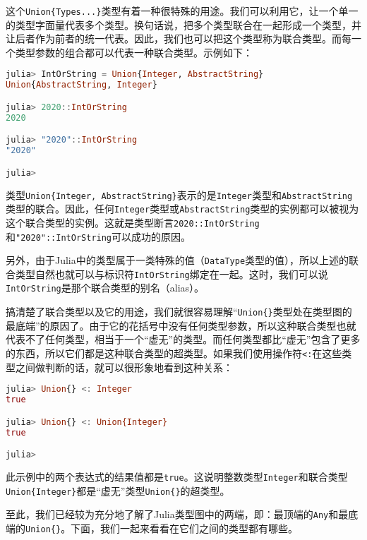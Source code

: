 这个\verb`Union{Types...}`类型有着一种很特殊的用途。我们可以利用它，让一个单一的类型字面量代表多个类型。换句话说，把多个类型联合在一起形成一个类型，并让后者作为前者的统一代表。因此，我们也可以把这个类型称为联合类型。而每一个类型参数的组合都可以代表一种联合类型。示例如下：

\begin{lstlisting}[language=julia]
julia> IntOrString = Union{Integer, AbstractString} 
Union{AbstractString, Integer}

julia> 2020::IntOrString
2020

julia> "2020"::IntOrString
"2020"

julia> 
\end{lstlisting}

类型\verb`Union{Integer, AbstractString}`表示的是\verb`Integer`类型和\verb`AbstractString`类型的联合。因此，任何\verb`Integer`类型或\verb`AbstractString`类型的实例都可以被视为这个联合类型的实例。这就是类型断言\verb`2020::IntOrString`和\verb`"2020"::IntOrString`可以成功的原因。

另外，由于Julia中的类型属于一类特殊的值（\verb`DataType`类型的值），所以上述的联合类型自然也就可以与标识符\verb`IntOrString`绑定在一起。这时，我们可以说\verb`IntOrString`是那个联合类型的别名（alias）。

搞清楚了联合类型以及它的用途，我们就很容易理解“\verb`Union{}`类型处在类型图的最底端”的原因了。由于它的花括号中没有任何类型参数，所以这种联合类型也就代表不了任何类型，相当于一个“虚无”的类型。而任何类型都比“虚无”包含了更多的东西，所以它们都是这种联合类型的超类型。如果我们使用操作符\verb`<:`在这些类型之间做判断的话，就可以很形象地看到这种关系：

\begin{lstlisting}[language=julia]
julia> Union{} <: Integer
true

julia> Union{} <: Union{Integer}
true

julia> 
\end{lstlisting}

此示例中的两个表达式的结果值都是\verb`true`。这说明整数类型\verb`Integer`和联合类型\verb`Union{Integer}`都是“虚无”类型\verb`Union{}`的超类型。

至此，我们已经较为充分地了解了Julia类型图中的两端，即：最顶端的\verb`Any`和最底端的\verb`Union{}`。下面，我们一起来看看在它们之间的类型都有哪些。

